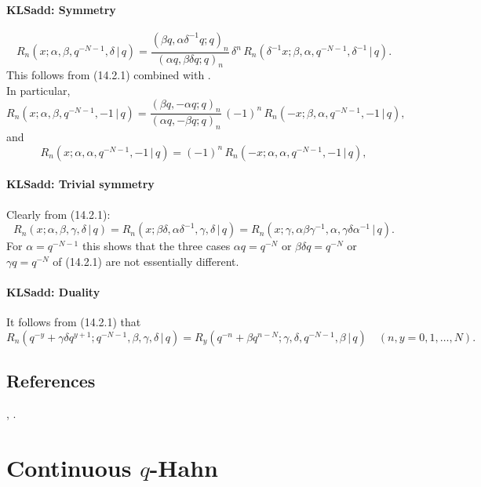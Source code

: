 \documentclass[envcountchap,graybox]{svmono}
\newcounter{rom}
\newcommand\sa{\smallskipamount}
\newcommand\sLP{\\[\sa]}
\newcommand\al\alpha
\newcommand\be\beta
\newcommand\ga\gamma
\newcommand\de\delta
\begin{document}
\paragraph{\large\bf KLSadd: Symmetry}\begin{equation}
R_n(x;\al,\be,q^{-N-1},\de\,|\, q)
=\frac{(\be q,\al\de^{-1}q;q)_n}{(\al q,\be\de q;q)_n}\,\de^n\,
R_n(\de^{-1}x;\be,\al,q^{-N-1},\de^{-1}\,|\, q).
\label{84}
\end{equation}
This follows from (14.2.1) combined with .
\sLP
In particular,
\begin{equation}
R_n(x;\al,\be,q^{-N-1},-1\,|\, q)
=\frac{(\be q,-\al q;q)_n}{(\al q,-\be q;q)_n}\,(-1)^n\,
R_n(-x;\be,\al,q^{-N-1},-1\,|\, q),
\label{85}
\end{equation}
and
\begin{equation}
R_n(x;\al,\al,q^{-N-1},-1\,|\, q)
=(-1)^n\,R_n(-x;\al,\al,q^{-N-1},-1\,|\, q),
\label{86}
\end{equation}

\paragraph{\large\bf KLSadd: Trivial symmetry}Clearly from (14.2.1):
\begin{equation}
R_n(x;\al,\be,\ga,\de\,|\, q)=R_n(x;\be\de,\al\de^{-1},\ga,\de\,|\, q)
=R_n(x;\ga,\al\be\ga^{-1},\al,\ga\de\al^{-1}\,|\, q).
\label{83}
\end{equation}
For $\al=q^{-N-1}$ this shows that the three cases
$\al q=q^{-N}$ or $\be\de q=q^{-N}$ or $\ga q=q^{-N}$ of (14.2.1)
are not essentially different.
%
\paragraph{\large\bf KLSadd: Duality}It follows from (14.2.1) that
\begin{equation}
R_n(q^{-y}+\ga\de q^{y+1};q^{-N-1},\be,\ga,\de\,|\, q)
=R_y(q^{-n}+\be q^{n-N};\ga,\de,q^{-N-1},\be\,|\, q)\quad
(n,y=0,1,\ldots,N).
\end{equation}
%

\subsection*{References}
\cite{AskeyRahmanSuslov}, \cite{Gupta96}.


\section{Continuous $q$-Hahn}
\par\setcounter{equation}{0}
\end{document}
